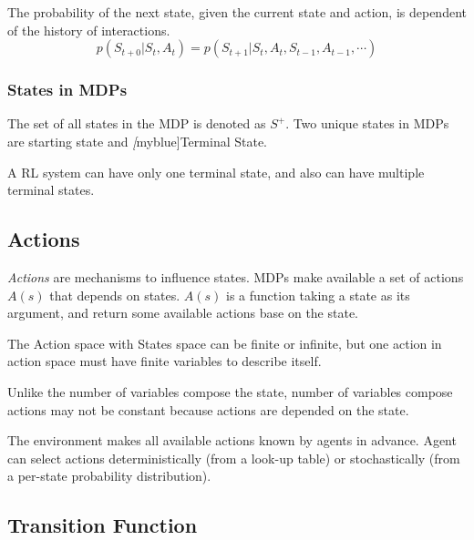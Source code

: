       \begin{definition}
        The probability of the next state, given the current state and action, is dependent of the history of interactions.
        \begin{equation}
          p(S_{t+0}|S_t, A_t) = p(S_{t+1}|S_t, A_t, S_{t-1}, A_{t-1}, \cdots)
        \end{equation}
      \end{definition}

    \subsubsection*{States in MDPs} The set of all states in the MDP is denoted as $S^+$. Two unique states in MDPs are
      starting state and \emph[myblue]{Terminal State}.

      A RL system can have only one terminal state, and also can have multiple terminal states.

  \subsection{Actions}

    \emph{Actions} are mechanisms to influence states. MDPs make available a set of actions $A(s)$ that depends on states.
    $A(s)$ is a function taking a state as its argument, and return some available actions base on the state. \par The
    Action space with States space can be finite or infinite, but one action in action space must have finite variables to
    describe itself. \par Unlike the number of variables compose the state, number of variables compose actions may not be
    constant because actions are depended on the state. \par The environment makes all available actions known by agents in
    advance. Agent can select actions deterministically (from a look-up table) or stochastically (from a per-state
    probability distribution).

  \subsection{Transition Function}

